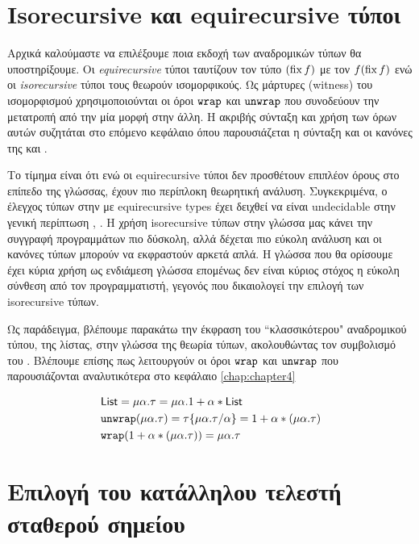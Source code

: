 \section{Isorecursive και equirecursive τύποι}
\label{sec:rectypes-intro}


Αρχικά καλούμαστε να επιλέξουμε ποια εκδοχή των αναδρομικών τύπων
θα υποστηρίξουμε.
Οι \emph{equirecursive} τύποι ταυτίζουν τον τύπο $(\operatorname{fix} f)$ με τον $f (\operatorname{fix} f)$ ενώ οι
\emph{isorecursive} τύποι τους θεωρούν ισομορφικούς. Ως μάρτυρες (witness) του ισομορφισμού
χρησιμοποιούνται οι όροι $\operatorname{\texttt{wrap}}$ και $\operatorname{\texttt{unwrap}}$ που συνοδεύουν  την μετατροπή από
την μία μορφή στην άλλη. Η ακριβής σύνταξη και χρήση των όρων αυτών συζητάται στο επόμενο
κεφάλαιο όπου παρουσιάζεται η σύνταξη και οι κανόνες της \FOMF{} και \FIR{}.

Το τίμημα είναι ότι ενώ οι equirecursive τύποι δεν προσθέτουν επιπλέον όρους στο επίπεδο
της γλώσσας, έχουν πιο περίπλοκη θεωρητική ανάλυση. Συγκεκριμένα, ο έλεγχος τύπων
στην \FOMF{} με equirecursive types έχει δειχθεί να είναι undecidable στην γενική περίπτωση
\cite{dreyer2007}, \cite{cai}. Η χρήση isorecursive τύπων στην γλώσσα μας κάνει την συγγραφή
προγραμμάτων πιο δύσκολη, αλλά δέχεται πιο εύκολη ανάλυση και οι κανόνες τύπων μπορούν
να εκφραστούν αρκετά απλά. Η γλώσσα που θα ορίσουμε έχει κύρια χρήση ως ενδιάμεση γλώσσα
επομένως δεν είναι κύριος στόχος η εύκολη σύνθεση από τον προγραμματιστή, γεγονός που
δικαιολογεί την επιλογή των isorecursive τύπων.

Ως παράδειγμα, βλέπουμε παρακάτω την έκφραση του ``κλασσικότερου" αναδρομικού
τύπου, της λίστας, στην γλώσσα της θεωρία τύπων, ακολουθώντας τον συμβολισμό του \cite{wadler:free-rectypes}. Βλέπουμε επίσης πως λειτουργούν οι όροι $\operatorname{\texttt{wrap}}$ και $\operatorname{\texttt{unwrap}}$ που παρουσιάζονται αναλυτικότερα
στο κεφάλαιο \ref{chap:chapter4}

\begin{align*}
       &  \operatorname{\textsf{List}} = \mu \alpha. \tau = \mu \alpha. 1 + \alpha*\operatorname{\textsf{List}} \\
  &       \operatorname{\texttt{unwrap}} (\mu \alpha. \tau) = \tau\{\mu \alpha. \tau / \alpha\} =
         1 + \alpha * (\mu \alpha. \tau) \\
     &   \operatorname{\texttt{wrap}} ( 1 + \alpha * (\mu \alpha. \tau)) =
         \mu \alpha. \tau \\
\end{align*}





\section{Επιλογή του κατάλληλου τελεστή σταθερού σημείου}
\label{sec:fixpoint_choice}

